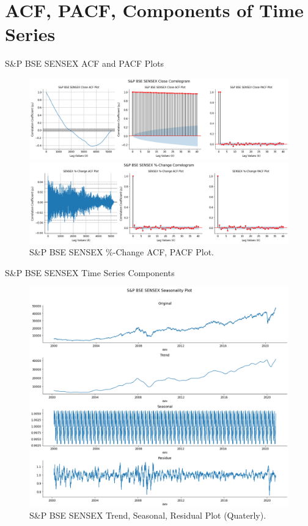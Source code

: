 \documentclass{beamer}
\begin{document}
\section{ACF, PACF, Components of Time Series}
\begin{frame}{S\&P BSE SENSEX ACF and PACF Plots}
	\begin{figure}
		\centering
		\includegraphics[width = 0.80 \textwidth]{images/SENSEX ACF and PACF Plot}
		\caption{S\&P BSE SENSEX ACF and PACF Plot.}
		\pause
		\includegraphics[width = 0.80 \textwidth]{images/SENSEX Change ACF, PACF Plots.png}
		\caption{S\&P BSE SENSEX \%-Change ACF, PACF Plot.}
	\end{figure}
		
\end{frame}

\begin{frame}{S\&P BSE SENSEX Time Series Components}
	\begin{figure}
		\centering
		\includegraphics[width = 0.65 \textwidth]{images/SENSEX Seasonal Decompose Plot.png}
		\caption{S\&P BSE SENSEX Trend, Seasonal, Residual Plot (Quaterly).}
		\label{fig:my_label}
	\end{figure}
\end{frame}
\end{document}

